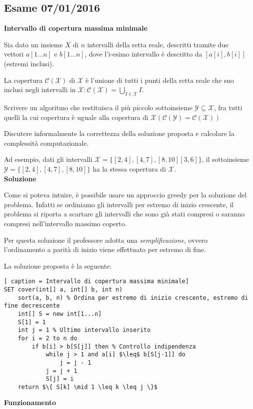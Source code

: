 \documentclass[../cheatSheetAlgoritmi.tex]{subfiles}
\begin{document}
\subsection{Esame 07/01/2016}
\textbf{Intervallo di copertura massima minimale} 

Sia dato un insieme $X$ di $n$ intervalli della retta reale, descritti tramite due vettori $a[1...n]$ e $b[1...n]$, dove l'i-esimo intervallo è descritto da $[ a[i], b[i] ]$ (estremi inclusi). 

La copertura $\mathcal{C(X)}$ di $\mathcal{X}$ è l'unione di tutti i punti della retta reale che sno inclusi negli intervalli in $\mathcal{X} : \mathcal{C(X)} = \bigcup_{I \in \mathcal{X}} I$. 

Scrivere un algoritmo che restituisca il più piccolo sottoinsieme $\mathcal{Y} \subseteq \mathcal{X}$, fra tutti quelli la cui copertura è uguale alla copertura di $\mathcal{X (C(Y) =C(X))}$ 

Discutere informalmente la correttezza della soluzione proposta e calcolare la complessità computazionale. 

Ad esempio, dati gli intervalli $\mathcal{X} = \{[2,4], [4,7], [8,10] [3,6]\}$, il sottoinsieme $\mathcal{Y}= \{[2,4], [4,7], [8,10]\}$ ha la stessa copertura di $\mathcal{X}$. \\
\textbf{Soluzione} 

Come si poteva intuire, è possibile usare un approccio greedy per la soluzione del problema. Infatti se ordiniamo gli intervalli per estremo di inizio crescente, il problema si riporta a scartare gli intervalli che sono già stati compresi o saranno compresi nell'intervallo massimo coperto. 

Per questa soluzione il professore adotta una \emph{semplificazione}, ovvero l'ordinamento a parità di inizio viene effettuato per estremo di fine. 

La soluzione proposta è la seguente: 
\begin{lstlisting}[ caption = Intervallo di copertura massima minimale]
SET cover(int[] a, int[] b, int n)
	sort(a, b, n) % Ordina per estremo di inizio crescente, estremo di fine decrescente
	int[] S = new int[1...n]
	S[1] = 1
	int j = 1 % Ultimo intervallo inserito
	for i = 2 to n do
		if b[i] > b[S[j]] then % Controllo indipendenza
			while j > 1 and a[i] $\leq$ b[S[j-1]] do
				j = j - 1
			j = j + 1
			S[j] = i
	return $\{ S[k] \mid 1 \leq k \leq j \}$ 
\end{lstlisting}
\textbf{Funzionamento} 
\end{document}
